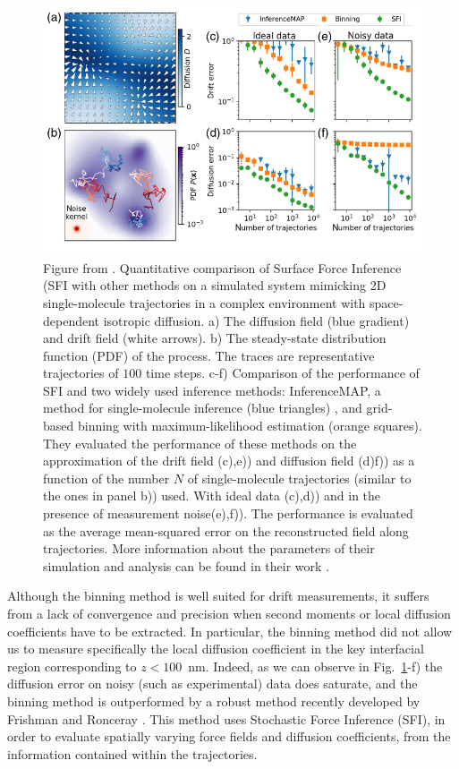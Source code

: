 \begin{figure}[h!]
	\centering
	\includegraphics[scale=0.6]{02_body/chapter3/images/diffusion_coefficient/figure_Ronceray.png}
	\caption{Figure from \cite{frishman_learning_2020}. Quantitative comparison of Surface Force Inference (\gls{SFI} with other methods on a simulated system mimicking 2D single-molecule trajectories in a complex environment with space-dependent isotropic diffusion. a) The diffusion field (blue gradient) and drift field (white arrows). b) The steady-state distribution function (\gls{PDF}) of the process. The traces are representative trajectories of $100$ time steps. c-f) Comparison of the performance of \gls{SFI} and two widely used inference methods: InferenceMAP, a method for single-molecule inference (blue triangles)  \cite{beheiry_inferencemap_2015}, and grid-based binning with maximum-likelihood estimation \cite{hoze_heterogeneity_2012, friedrich_approaching_2011} (orange squares). They evaluated the performance of these methods on the approximation of the drift field (c),e)) and diffusion field (d)f)) as a function of the number $N$ of single-molecule trajectories (similar to the ones in panel b)) used. With ideal data (c),d)) and in the presence of measurement noise(e),f)). The performance is evaluated as the average mean-squared error on the reconstructed field along trajectories.  More information about the parameters of their simulation and analysis can be found in their work \cite{frishman_learning_2020}.}
	\label{fig.ronceray}
\end{figure}

Although the binning method is well suited for drift measurements, it suffers from a lack of convergence and precision when second moments or local diffusion coefficients have to be extracted. In particular, the binning method did not allow us to measure specifically the local diffusion coefficient in the key interfacial region corresponding to $z<100$~nm. Indeed, as we can observe in Fig.~\ref{fig.ronceray}-f) the diffusion error on noisy (such as experimental) data does saturate, and the binning method is outperformed by a robust method  recently developed by Frishman and Ronceray \cite{frishman_learning_2020}. This method uses Stochastic Force Inference (\gls{SFI}), in order to evaluate spatially varying force fields and diffusion coefficients, from the information contained within the trajectories. 

